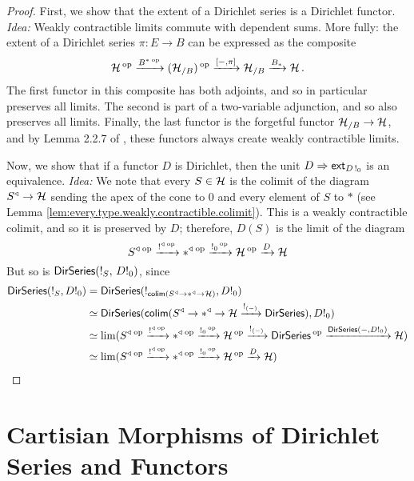 \begin{proof}
  First, we show that the extent of a Dirichlet series is a Dirichlet functor.
  \emph{Idea:} Weakly contractible limits commute with dependent sums. More
  fully: the extent of a Dirichlet series $\pi : E \to B$ can be expressed as
  the composite
  $$\Ha\op \xto{B^{\ast}\op} (\Ha_{/B})\op \xto{[-,\pi]} \Ha_{/B} \xto{B_{\ast}}
  \Ha.$$
  The first functor in this composite has both adjoints, and so in particular
  preserves all limits. The second is part of a two-variable adjunction, and so
  also preserves all limits. Finally, the last functor is the forgetful functor
  $\Ha_{/B} \to \Ha$, and by Lemma 2.2.7 of \cite{GHK:Analytic.Monads}, these
  functors always create weakly contractible limits.

  Now, we show that if a functor $D$ is Dirichlet, then the unit $D \Rightarrow
  \term{ext}_{D\bang_0}$ is an equivalence.
  \emph{Idea:} We note that every $S \in \Ha$ is the colimit of the diagram
  $S^{\triangleleft} \to \Ha$ sending the apex of the cone to $0$ and every
  element of $S$ to $\ast$ (see Lemma
  \ref{lem:every.type.weakly.contractible.colimit}). This is a weakly
  contractible colimit, and so it is preserved by $D$; therefore, $D(S)$ is the
  limit of the diagram
  $$S^{\triangleleft}\op \xto{\bang^{\triangleleft}\op}
  \ast^{\triangleleft}\op \xto{\bang_0\op} \Ha\op \xto{D} \Ha$$
  But so is $\DirSeries(!_S,\, D!_0)$, since
  \begin{align*}
    \DirSeries(!_S, D!_0) &=  \DirSeries(!_{\colim (S^{\triangleleft} \to \ast^{\triangleleft} \to \Ha)}, D!_0) \\
    &\simeq \DirSeries(\colim (S^{\triangleleft} \to \ast^{\triangleleft} \to \Ha \xto{!_{(-)}} \DirSeries), D!_0) \\
    &\simeq \lim (S^{\triangleleft}\op \xto{\bang^{\triangleleft}\op}
  \ast^{\triangleleft}\op \xto{\bang_0\op} \Ha\op \xto{!_{(-)}} \DirSeries\op \xto{\DirSeries(-, D!_0)} \Ha)\\
    &\simeq \lim (S^{\triangleleft}\op \xto{\bang^{\triangleleft}\op}
  \ast^{\triangleleft}\op \xto{\bang_0\op} \Ha\op \xto{D} \Ha) 
  \end{align*}
\end{proof}

\section{Cartisian Morphisms of Dirichlet Series and Functors}

